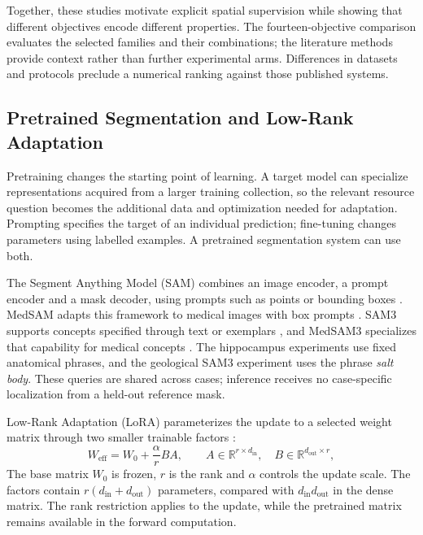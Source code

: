 \documentclass[12pt,a4paper]{article}
\begin{document}
Together, these studies motivate explicit spatial supervision while
showing that different objectives encode different properties. The
fourteen-objective comparison evaluates the selected families and their
combinations; the literature methods provide context rather than further
experimental arms. Differences in datasets and protocols preclude a
numerical ranking against those published systems.

\subsection{Pretrained Segmentation and Low-Rank Adaptation}
\label{sec:pretrained-adaptation}

Pretraining changes the starting point of learning. A target model can
specialize representations acquired from a larger training collection,
so the relevant resource question becomes the additional data and
optimization needed for adaptation. Prompting specifies the target of
an individual prediction; fine-tuning changes parameters using labelled
examples. A pretrained segmentation system can use both.

The Segment Anything Model (SAM) combines an image encoder, a prompt encoder and a mask decoder,
using prompts such as points or bounding boxes
\cite{kirillov2023segment}. MedSAM adapts this framework to medical
images with box prompts \cite{ma2024medsam}. SAM3 supports concepts
specified through text or exemplars \cite{carion2025sam3}, and MedSAM3
specializes that capability for medical concepts \cite{liu2025medsam3}.
The hippocampus experiments use fixed anatomical phrases, and the
geological SAM3 experiment uses the phrase \emph{salt body}. These queries
are shared across cases; inference receives no case-specific localization
from a held-out reference mask.

Low-Rank Adaptation (LoRA) parameterizes the update to a selected weight matrix
through two smaller trainable factors \cite{hu2021lora}:
\begin{equation}
W_{\mathrm{eff}}=W_0+\frac{\alpha}{r}BA,
\qquad
A\in\mathbb{R}^{r\times d_{\mathrm{in}}},\quad
B\in\mathbb{R}^{d_{\mathrm{out}}\times r},
\label{eq:lora-weight-update}
\end{equation}
The base matrix $W_0$ is frozen, $r$ is the rank and $\alpha$ controls
the update scale. The factors contain
$r(d_{\mathrm{in}}+d_{\mathrm{out}})$ parameters, compared with
$d_{\mathrm{in}}d_{\mathrm{out}}$ in the dense matrix. The rank restriction
applies to the update, while the pretrained matrix remains available
in the forward computation.
\end{document}
